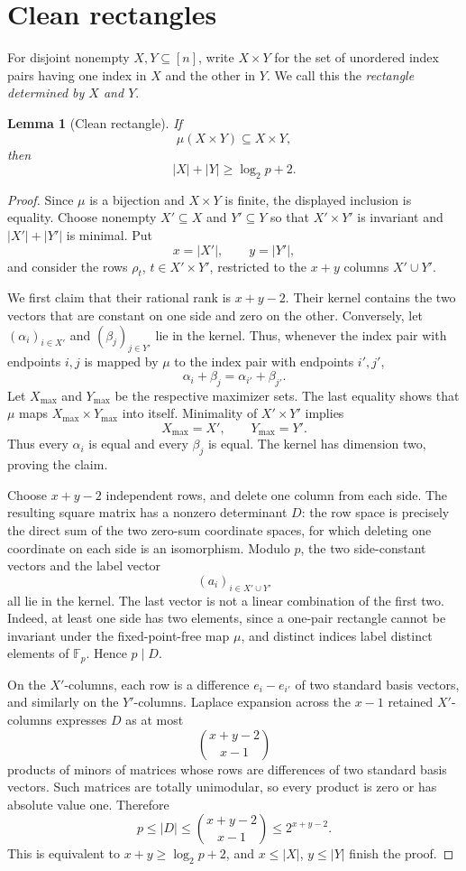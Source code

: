 \documentclass[10pt]{article}
\newtheorem{lemma}[theorem]{Lemma}
\theoremstyle{definition}
\begin{document}
\section{Clean rectangles}

For disjoint nonempty $X,Y\subseteq[n]$, write $X\times Y$ for the set of
unordered index pairs having one index in $X$ and the other in $Y$.  We call
this the \emph{rectangle determined by $X$ and $Y$}.

\begin{lemma}[Clean rectangle]
If
\[
    \mu(X\times Y)\subseteq X\times Y,
\]
then
\[
    |X|+|Y|\ge\log_2p+2.
\]
\end{lemma}

\begin{proof}
Since $\mu$ is a bijection and $X\times Y$ is finite, the displayed
inclusion is equality.  Choose nonempty $X'\subseteq X$ and
$Y'\subseteq Y$ so that $X'\times Y'$ is invariant and
$|X'|+|Y'|$ is minimal.  Put
\[
    x=|X'|,
    \qquad
    y=|Y'|,
\]
and consider the rows $\rho_t$, $t\in X'\times Y'$, restricted to the
$x+y$ columns $X'\cup Y'$.

We first claim that their rational rank is $x+y-2$.  Their kernel contains
the two vectors that are constant on one side and zero on the other.
Conversely, let $(\alpha_i)_{i\in X'}$ and $(\beta_j)_{j\in Y'}$ lie in the
kernel.  Thus, whenever the index pair with endpoints $i,j$ is mapped by
$\mu$ to the index pair with endpoints $i',j'$,
\[
    \alpha_i+\beta_j=\alpha_{i'}+\beta_{j'}.
\]
Let $X_{\max}$ and $Y_{\max}$ be the respective maximizer sets.  The last
equality shows that $\mu$ maps $X_{\max}\times Y_{\max}$ into itself.
Minimality of $X'\times Y'$ implies
\[
    X_{\max}=X',
    \qquad
    Y_{\max}=Y'.
\]
Thus every $\alpha_i$ is equal and every $\beta_j$ is equal.  The kernel has
dimension two, proving the claim.

Choose $x+y-2$ independent rows, and delete one column from each side.  The
resulting square matrix has a nonzero determinant $D$: the row space is
precisely the direct sum of the two zero-sum coordinate spaces, for which
deleting one coordinate on each side is an isomorphism.  Modulo $p$, the two
side-constant vectors and the label vector
\[
    (a_i)_{i\in X'\cup Y'}
\]
all lie in the kernel.  The last vector is not a linear combination of the
first two.  Indeed, at least one side has two elements, since a one-pair
rectangle cannot be invariant under the fixed-point-free map $\mu$, and
distinct indices label distinct elements of $\mathbb F_p$.  Hence $p\mid D$.

On the $X'$-columns, each row is a difference $e_i-e_{i'}$ of two standard
basis vectors, and similarly on the $Y'$-columns.  Laplace expansion across
the $x-1$ retained $X'$-columns expresses $D$ as at most
\[
    \binom{x+y-2}{x-1}
\]
products of minors of matrices whose rows are differences of two standard
basis vectors.  Such matrices are totally unimodular, so every product is
zero or has absolute value one.  Therefore
\[
    p\le|D|\le\binom{x+y-2}{x-1}\le2^{x+y-2}.
\]
This is equivalent to $x+y\ge\log_2p+2$, and
$x\le|X|$, $y\le|Y|$ finish the proof.
\end{proof}
\end{document}
